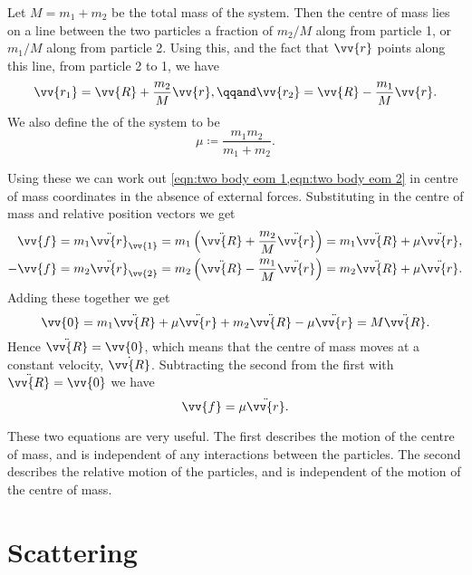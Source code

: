     Let \(M = m_1 + m_2\) be the total mass of the system.
    Then the centre of mass lies on a line between the two particles a fraction of \(m_2/M\) along from particle 1, or \(m_1/M\) along from particle 2.
    Using this, and the fact that \(\vv{r}\) points along this line, from particle 2 to 1, we have
    \begin{equation}
        \vv{r_1} = \vv{R} + \frac{m_2}{M}\vv{r}, \qqand \vv{r_2} = \vv{R} - \frac{m_1}{M}\vv{r}.
    \end{equation}
    We also define the  of the system to be
    \begin{equation}
        \mu \coloneqq \frac{m_1m_2}{m_1 + m_2}.
    \end{equation}
    
    Using these we can work out \cref{eqn:two body eom 1,eqn:two body eom 2} in centre of mass coordinates in the absence of external forces.
    Substituting in the centre of mass and relative position vectors we get
    \begin{align}
        \vv{f} = m_1\ddot{\vv{r}}_{\vv{1}} &= m_1\left( \ddot{\vv{R}} + \frac{m_2}{M}\ddot{\vv{r}} \right) = m_1\ddot{\vv{R}} + \mu\ddot{\vv{r}},\\
        -\vv{f} = m_2\ddot{\vv{r}}_{\vv{2}} &= m_2\left( \ddot{\vv{R}} - \frac{m_1}{M}\ddot{\vv{r}} \right) = m_2\ddot{\vv{R}} + \mu\ddot{\vv{r}}.
    \end{align}
    Adding these together we get
    \begin{equation}
        \vv{0} = m_1\ddot{\vv{R}} + \mu\ddot{\vv{r}} + m_2\ddot{\vv{R}} - \mu\ddot{\vv{r}} = M\ddot{\vv{R}}.
    \end{equation}
    Hence \(\ddot{\vv{R}} = \vv{0}\), which means that the centre of mass moves at a constant velocity, \(\dot{\vv{R}}\).
    Subtracting the second from the first with \(\ddot{\vv{R}} = \vv{0}\) we have
    \begin{equation}
        \vv{f} = \mu\ddot{\vv{r}}.
    \end{equation}
    
    These two equations are very useful.
    The first describes the motion of the centre of mass, and is independent of any interactions between the particles.
    The second describes the relative motion of the particles, and is independent of the motion of the centre of mass.
    
    \section{Scattering}
